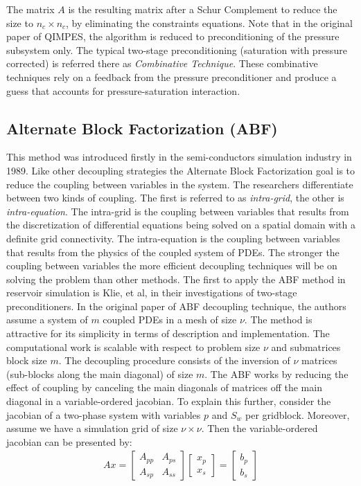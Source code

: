 The matrix $A$ is the resulting matrix after a Schur Complement to reduce the size to $n_{c}\times n_{c}$, by eliminating the constraints equations.
Note that in the original paper of QIMPES, the algorithm is reduced to preconditioning of the pressure subsystem only. The typical two-stage preconditioning
(saturation with pressure corrected) is referred there as \textit{Combinative Technique}. These combinative techniques rely on a feedback from the pressure preconditioner
and produce a guess that accounts for pressure-saturation interaction.

\subsection{Alternate Block Factorization (ABF)}
This method was introduced firstly in the semi-conductors simulation industry in 1989\supercite{Bank1989}. Like other decoupling strategies the
Alternate Block Factorization goal is to reduce the coupling between variables in the system. The researchers differentiate between two kinds
of coupling. The first is referred to as \textit{intra-grid}, the other is \textit{intra-equation}. The intra-grid is the coupling between 
variables that results from the discretization of differential equations being solved on a spatial domain with a definite grid connectivity.
The intra-equation is the coupling between variables that results from the physics of the coupled system of PDEs.
The stronger the coupling between variables the more efficient decoupling techniques will be on solving the problem than other methods.
The first to apply the ABF method in reservoir simulation is Klie, et al\supercite{klie}, in their investigations of two-stage preconditioners. 
In the original paper of ABF decoupling technique, the authors assume a system of $m$ coupled PDEs in a mesh of size $\nu$.
The method is attractive for its simplicity in terms of description and implementation. The computational work is scalable with respect to 
problem size $\nu$ and submatrices block size $m$. The decoupling procedure consists of the inversion of $\nu$ matrices (sub-blocks along the main diagonal) of size $m$. 
The ABF works by reducing the effect of coupling by canceling the main diagonals of matrices off the main diagonal in a variable-ordered jacobian.
To explain this further, consider the jacobian of a two-phase system with variables $p$ and $S_{w}$ per gridblock. Moreover, assume we have a simulation grid of size $\nu\times\nu$.
Then the variable-ordered jacobian can be presented by:
\begin{align}
	Ax = 
\begin{bmatrix}
	A_{pp} & A_{ps}\\
	A_{sp} & A_{ss}
\end{bmatrix}
\begin{bmatrix}
	x_{p} \\
	x_{s}
\end{bmatrix}
=
\begin{bmatrix}
	b_{p} \\
	b_{s}
\end{bmatrix}
\end{align}
